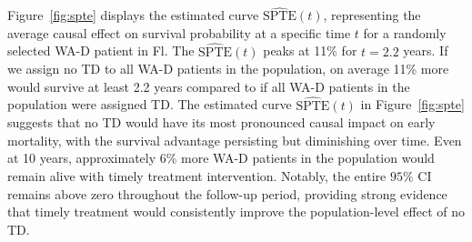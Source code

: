 \documentclass[aoas]{imsart}
\theoremstyle{plain}
\theoremstyle{definition}
\begin{document}
\noindent Figure~\ref{fig:spte} displays the estimated curve $\widehat{\text{SPTE}}(t)$, representing the average causal effect on survival probability at a specific time  $t$ for a randomly selected WA-D patient in Fl. The $\widehat{\text{SPTE}}(t)$ peaks at 11\% for $t=2.2$ years. If we assign no TD to all WA-D patients in the population, on average 11\% more would survive at least 2.2 years compared to if all WA-D patients in the population were assigned TD. The estimated curve $\widehat{\text{SPTE}}(t)$ in Figure~\ref{fig:spte} suggests that no TD would have its most pronounced causal impact on early mortality, with the survival advantage persisting but diminishing over time. Even at 10 years, approximately 6\% more WA-D patients in the population would remain alive with timely treatment intervention. Notably, the entire $95\%$ CI remains above zero throughout the follow-up period, providing strong evidence that timely treatment would consistently improve the population-level effect of no TD. 
\end{document}
